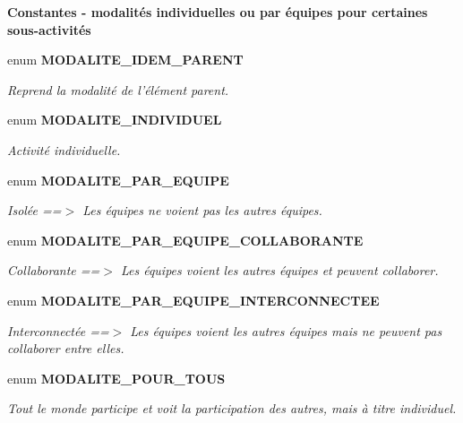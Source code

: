 \begin{Indent}{\bf Constantes - modalités individuelles ou par équipes pour certaines sous-activités}\par
\begin{CompactItemize}
\item 
enum {\bf MODALITE\_\-IDEM\_\-PARENT} 
\begin{CompactList}\small\item\em Reprend la modalité de l'élément parent. \item\end{CompactList}\item 
enum {\bf MODALITE\_\-INDIVIDUEL} 
\begin{CompactList}\small\item\em Activité individuelle. \item\end{CompactList}\item 
enum {\bf MODALITE\_\-PAR\_\-EQUIPE} 
\begin{CompactList}\small\item\em Isolée ==$>$ Les équipes ne voient pas les autres équipes. \item\end{CompactList}\item 
enum {\bf MODALITE\_\-PAR\_\-EQUIPE\_\-COLLABORANTE} 
\begin{CompactList}\small\item\em Collaborante ==$>$ Les équipes voient les autres équipes et peuvent collaborer. \item\end{CompactList}\item 
enum {\bf MODALITE\_\-PAR\_\-EQUIPE\_\-INTERCONNECTEE} 
\begin{CompactList}\small\item\em Interconnectée ==$>$ Les équipes voient les autres équipes mais ne peuvent pas collaborer entre elles. \item\end{CompactList}\item 
enum {\bf MODALITE\_\-POUR\_\-TOUS} 
\begin{CompactList}\small\item\em Tout le monde participe et voit la participation des autres, mais à titre individuel. \item\end{CompactList}\end{CompactItemize}
\end{Indent}
